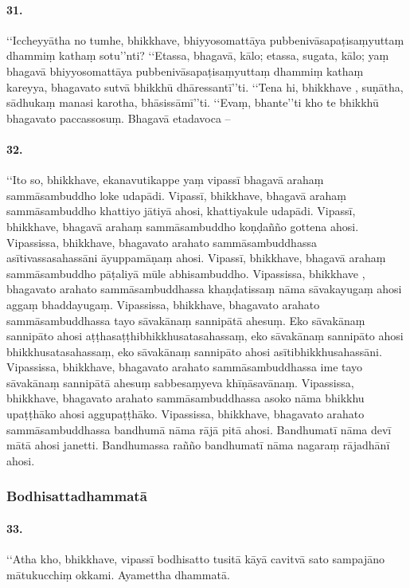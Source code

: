 \paragraph{31.}‘‘Iccheyyātha no tumhe, bhikkhave, bhiyyosomattāya pubbenivāsapaṭisaṃyuttaṃ dhammiṃ kathaṃ sotu’’nti? ‘‘Etassa, bhagavā, kālo; etassa, sugata, kālo; yaṃ bhagavā bhiyyosomattāya pubbenivāsapaṭisaṃyuttaṃ dhammiṃ kathaṃ kareyya, bhagavato sutvā bhikkhū dhāressantī’’ti. ‘‘Tena hi, bhikkhave , suṇātha, sādhukaṃ manasi karotha, bhāsissāmī’’ti. ‘‘Evaṃ, bhante’’ti kho te bhikkhū bhagavato paccassosuṃ. Bhagavā etadavoca –

\paragraph{32.} ‘‘Ito so, bhikkhave, ekanavutikappe yaṃ vipassī bhagavā arahaṃ sammāsambuddho loke udapādi. Vipassī, bhikkhave, bhagavā arahaṃ sammāsambuddho khattiyo jātiyā ahosi, khattiyakule udapādi. Vipassī, bhikkhave, bhagavā arahaṃ sammāsambuddho koṇḍañño gottena ahosi. Vipassissa, bhikkhave, bhagavato arahato sammāsambuddhassa asītivassasahassāni āyuppamāṇaṃ ahosi. Vipassī, bhikkhave, bhagavā arahaṃ sammāsambuddho pāṭaliyā mūle abhisambuddho. Vipassissa, bhikkhave , bhagavato arahato sammāsambuddhassa khaṇḍatissaṃ nāma sāvakayugaṃ ahosi aggaṃ bhaddayugaṃ. Vipassissa, bhikkhave, bhagavato arahato sammāsambuddhassa tayo sāvakānaṃ sannipātā ahesuṃ. Eko sāvakānaṃ sannipāto ahosi aṭṭhasaṭṭhibhikkhusatasahassaṃ, eko sāvakānaṃ sannipāto ahosi bhikkhusatasahassaṃ, eko sāvakānaṃ sannipāto ahosi asītibhikkhusahassāni. Vipassissa, bhikkhave, bhagavato arahato sammāsambuddhassa ime tayo sāvakānaṃ sannipātā ahesuṃ sabbesaṃyeva khīṇāsavānaṃ. Vipassissa, bhikkhave, bhagavato arahato sammāsambuddhassa asoko nāma bhikkhu upaṭṭhāko ahosi aggupaṭṭhāko. Vipassissa, bhikkhave, bhagavato arahato sammāsambuddhassa bandhumā nāma rājā pitā ahosi. Bandhumatī nāma devī mātā ahosi janetti. Bandhumassa rañño bandhumatī nāma nagaraṃ rājadhānī ahosi.

\subsubsection{Bodhisattadhammatā}

\paragraph{33.} ‘‘Atha kho, bhikkhave, vipassī bodhisatto tusitā kāyā cavitvā sato sampajāno mātukucchiṃ okkami. Ayamettha dhammatā.


